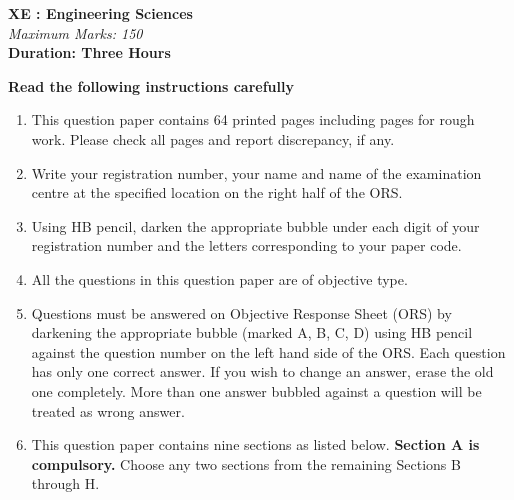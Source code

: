 \documentclass[12pt]{article}
\begin{document}
\begin{center}

   \textbf{\large XE : Engineering Sciences} \\[1em]
    \textit{Maximum Marks: 150} \\[1em]
    \textbf{Duration: Three Hours}
\end{center}


\textbf{Read the following instructions carefully}
\begin{enumerate}[label=\arabic*.]
    \item This question paper contains 64 printed pages including pages for rough work. Please check all pages and report discrepancy, if any.

    \item Write your registration number, your name and name of the examination centre at the specified location on the right half of the ORS.

    \item Using HB pencil, darken the appropriate bubble under each digit of your registration number and the letters corresponding to your paper code.

    \item All the questions in this question paper are of objective type.

    \item Questions must be answered on Objective Response Sheet (ORS) by darkening the appropriate bubble (marked A, B, C, D) using HB pencil against the question number on the left hand side of the ORS. Each question has only one correct answer. If you wish to change an answer, erase the old one completely. More than one answer bubbled against a question will be treated as wrong answer.

    \item This question paper contains nine sections as listed below. \textbf{Section A is compulsory.} Choose any two sections from the remaining Sections B through H.
\end{enumerate}
\end{document}

